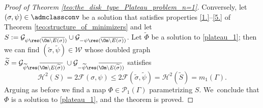 \begin{proof}[Proof of Theorem \ref{teo:the_disk_type_Plateau_problem_n=1}]
Conversely, let $(\sigma,\psi)\in \admclassconv$ be a solution that
satisfies properties \ref{1.}--\ref{5.} of Theorem \ref{teo:structure_of_minimizers} and let $S:=\mathcal{G}_{\psi\res(\overline{\Om\setminus E(\sigma)})}
\cup \mathcal{G}_{-\psi\res(\overline{\Om\setminus E(\sigma)})}$.
Let $\widetilde\Phi$ be a solution to \eqref{plateau_1}; then we can find $(\widetilde\sigma,\widetilde\psi)\in \mathcal W$ whose
doubled graph $\widetilde S=\mathcal G_{\widetilde\psi\res (\overline{\Om\setminus E(\widetilde\sigma)})}\cup\mathcal G_{-\widetilde\psi\res (\overline{\Om\setminus E(\widetilde\sigma)})}$ satisfies
\[
 \mathcal H^2(S)=2\mathcal F(\sigma,\psi)\leq2\mathcal F(\widetilde\sigma,\widetilde\psi)=\mathcal H^2(\widetilde S)=m_1(\Gamma).
\]
Arguing as before we find a map $\Phi\in \mathcal P_1(\Gamma)$ parametrizing $S$. We~conclude that $\Phi$ is a solution to \eqref{plateau_1}, and the theorem is proved.
\end{proof}

